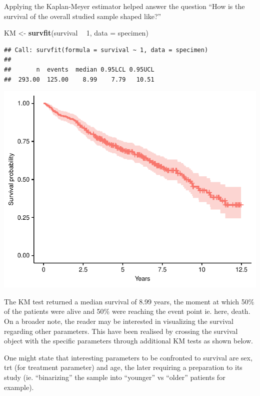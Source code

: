 \documentclass[]{article}
\newenvironment{Shaded}{\begin{snugshade}}{\end{snugshade}}
\newcommand{\KeywordTok}[1]{\textcolor[rgb]{0.13,0.29,0.53}{\textbf{#1}}}
\newcommand{\DataTypeTok}[1]{\textcolor[rgb]{0.13,0.29,0.53}{#1}}
\newcommand{\DecValTok}[1]{\textcolor[rgb]{0.00,0.00,0.81}{#1}}
\newcommand{\StringTok}[1]{\textcolor[rgb]{0.31,0.60,0.02}{#1}}
\newcommand{\OperatorTok}[1]{\textcolor[rgb]{0.81,0.36,0.00}{\textbf{#1}}}
\newcommand{\NormalTok}[1]{#1}
\begin{document}
Applying the Kaplan-Meyer estimator helped answer the question ``How is
the survival of the overall studied sample shaped like?''

\begin{Shaded}
\begin{Highlighting}[]
\NormalTok{KM <-}\StringTok{ }\KeywordTok{survfit}\NormalTok{(survival }\OperatorTok{~}\StringTok{ }\DecValTok{1}\NormalTok{, }\DataTypeTok{data =}\NormalTok{ specimen)}
\end{Highlighting}
\end{Shaded}

\begin{verbatim}
## Call: survfit(formula = survival ~ 1, data = specimen)
## 
##       n  events  median 0.95LCL 0.95UCL 
##  293.00  125.00    8.99    7.79   10.51
\end{verbatim}

\includegraphics{survival_v5_files/figure-latex/unnamed-chunk-13-1.pdf}

The KM test returned a median survival of 8.99 years, the moment at
which 50\% of the patients were alive and 50\% were reaching the event
point ie. here, death. On a broader note, the reader may be interested
in visualizing the survival regarding other parameters. This have been
realised by crossing the survival object with the specific parameters
through additional KM tests as shown below.

One might state that interesting parameters to be confronted to survival
are sex, trt (for treatment parameter) and age, the later requiring a
preparation to its study (ie. ``binarizing'' the sample into ``younger''
vs ``older'' patients for example).
\end{document}
